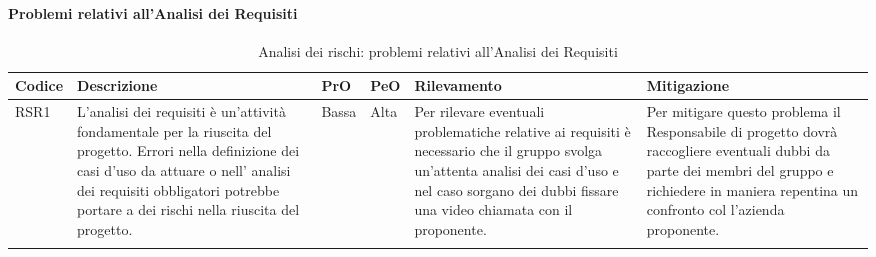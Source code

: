 \paragraph{Problemi relativi all'Analisi dei Requisiti}
\begin{center}

	\begin{longtable}{p{1cm}|p{4cm}|p{0.7cm}|p{0.7cm}|p{3cm}|p{4cm}}
		\arrayrulecolor{white}
		\hline
		\rowcolor{blue!20}
		\textbf{Codice} & 
		\textbf{Descrizione} &
		\textbf{PrO}  &
		\textbf{PeO}  &				        
		\textbf{Rilevamento} &
		\textbf{Mitigazione} \\
		\hline	
		RSR1 & L'analisi dei requisiti è un'attività fondamentale per la riuscita del progetto.  Errori nella definizione dei casi d'uso da attuare o nell' analisi dei requisiti obbligatori potrebbe portare a dei rischi nella riuscita del progetto. & Bassa & Alta & Per rilevare eventuali problematiche relative ai requisiti è necessario che il gruppo svolga un'attenta analisi dei casi d'uso e nel caso sorgano dei dubbi fissare una video chiamata con il proponente. & Per mitigare questo problema il Responsabile di progetto dovrà raccogliere eventuali dubbi da parte dei membri del gruppo e richiedere in maniera repentina un confronto col l'azienda proponente. \\
	
		\rowcolor{white}
		\caption{Analisi dei rischi: problemi relativi all'Analisi dei Requisiti}
	\end{longtable}
\end{center}